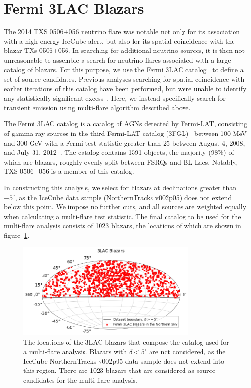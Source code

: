 \section{Fermi 3LAC Blazars}
The 2014 TXS 0506+056 neutrino flare was notable not only for its association with a high energy IceCube alert, but also for its spatial coincidence with the blazar TXs 0506+056. In searching for additional neutrino sources, it is then not unreasonable to assemble a search for neutrino flares associated with a large catalog of blazars. For this purpose, we use the Fermi 3LAC catalog~\cite{fermi_3lac} to define a set of source candidates. Previous analyses searching for spatial coincidence with earlier iterations of this catalog have been performed, but were unable to identify any statistically significant excess~\cite{2lac_ic}. Here, we instead specifically search for transient emission using multi-flare algorithm described above. 

The Fermi 3LAC catalog is a catalog of AGNs detected by Fermi-LAT, consisting of gamma ray sources in the third Fermi-LAT catalog (3FGL)~\cite{fermi3fgl} between 100 MeV and 300 GeV with a Fermi test statistic greater than 25 between August 4, 2008, and July 31, 2012~\cite{fermi_3lac}. The catalog contains 1591 objects, the majority (98\%) of which are blazars, roughly evenly split between FSRQs and BL Lacs. Notably, TXS 0506+056 is a member of this catalog. 

In constructing this analysis, we select for blazars at declinations greater than $-5^{\circ}$, as the IceCube data sample (NorthernTracks v002p05) does not extend below this point. We impose no further cuts, and all sources are weighted equally when calculating a multi-flare test statistic. The final catalog to be used for the multi-flare analysis consists of 1023 blazars, the locations of which are shown in figure~\ref{fig:3laccat}.

\begin{figure}[h]
\centering
\includegraphics[width=0.8\textwidth]{figs/3lac_skymap.png}
\caption{The locations of the 3LAC blazars that compose the catalog used for a multi-flare analysis. Blazars with $\delta<5^{\circ}$ are not considered, as the IceCube NorthernTracks v002p05 data sample does not extend into this region. There are 1023 blazars that are considered as source candidates for the multi-flare analysis.}
\label{fig:3laccat}
\end{figure}

